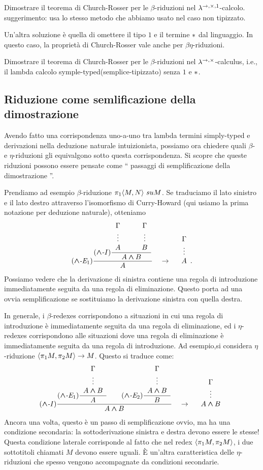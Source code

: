 \documentclass{article}
\begin{document}
\begin{exercise}
  Dimostrare il teorema di Church-Rosser per le $\beta$-riduzioni nel
  $\lambda^{\to,\times,1}$-calcolo. suggerimento: usa lo stesso metodo che abbiamo usato nel caso non tipizzato.
\end{exercise}

Un'altra soluzione \`e quella di omettere il tipo $1$ e il termine ${*}$ dal
linguaggio. In questo caso, la propriet\`a di Church-Rosser vale anche per
$\beta\eta$-riduzioni.

\begin{exercise}
  Dimostrare il teorema di Church-Rosser per le $\beta$-riduzioni nel
  $\lambda^{\to,\times}$-calculus, i.e., il lambda calcolo symple-typed(semplice-tipizzato) 
 senza $1$ e ${*}$.
\end{exercise}

\subsection{Riduzione come semlificazione della dimostrazione}

Avendo fatto una corrispondenza uno-a-uno tra lambda termini simply-typed
e derivazioni nella deduzione naturale intuizionista, possiamo ora chiedere 
quali $\beta$- e $\eta$-riduzioni gli equivalgono sotto questa corrispondenza.
Si scopre che queste riduzioni possono essere pensate come `` passaggi di semplificazione della dimostrazione ''.

Prendiamo ad esempio $\beta$-riduzione $\pi_1\langle M,N\rangle\ su M $.
Se traduciamo il lato sinistro e il lato destro attraverso l'isomorfismo di Curry-Howard 
(qui usiamo la prima notazione per deduzione naturale), otteniamo
\[ \trule{$\cand$-E$_1$}\deriv{\trule{$\cand$-I}\deriv{\ideriv{\Gamma}{A}\sep\ideriv{\Gamma}{B}}{A\cand B}}{A}
\ssep\to\ssep \ideriv{\Gamma}{A}.
\]
Possiamo vedere che la derivazione di sinistra contiene una regola di 
introduzione immediatamente seguita da una regola di eliminazione. 
Questo porta ad una ovvia semplificazione se sostituiamo la derivazione sinistra con quella destra.

In generale, i $\beta$-redexes corrispondono a situazioni in cui
una regola di introduzione \`e immediatamente seguita da una regola di 
eliminazione, ed i $\eta$-redexes corrispondono alle situazioni dove 
una regola di eliminazione \`e immediatamente seguita da una regola di introduzione.
Ad esempio,si considera $\eta$-riduzione  $\langle\pi_1 M,\pi_2 M\rangle \to M$. 
Questo si traduce come:
\[
\trule{$\cand$-I}\deriv{\trule{$\cand$-E$_1$}\deriv{\ideriv{\Gamma}{A\cand
      B}}{A}\sep\trule{$\cand$-E$_2$}\deriv{\ideriv{\Gamma}{A\cand
      B}}{B}}{A\cand B}
\ssep\to\ssep \ideriv{\Gamma}{A\cand B}
\]
Ancora una volta, questo \`e un passo di semplificazione ovvio, ma ha una condizione secondaria: 
la sottoderivazione sinistra e destra devono essere le stesse! 
Questa condizione laterale corrisponde al fatto che nel redex $\langle\pi_1
M,\pi_2 M\rangle$, i due sottotitoli chiamati $M$ devono essere uguali.
\`E un'altra caratteristica delle $\eta$-riduzioni che spesso vengono accompagnate 
da condizioni secondarie.
\end{document}

